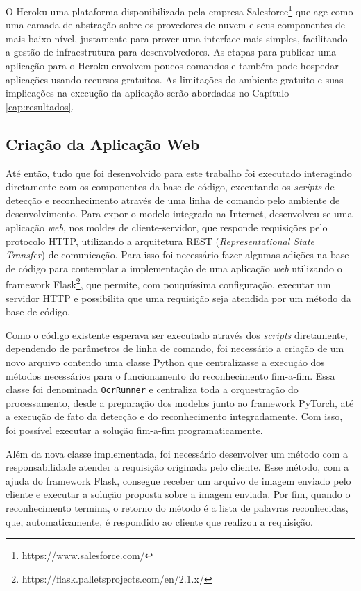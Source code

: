O Heroku uma plataforma disponibilizada pela empresa Salesforce\footnote{https://www.salesforce.com/} que age como uma camada de abstração sobre os 
provedores de nuvem e seus componentes de mais baixo nível, justamente para prover uma interface mais simples, facilitando a gestão de infraestrutura 
para desenvolvedores. As etapas para publicar uma aplicação para o Heroku envolvem poucos comandos e também pode hospedar aplicações usando recursos 
gratuitos. As limitações do ambiente gratuito e suas implicações na execução da aplicação serão abordadas no Capítulo \ref{cap:resultados}.

\subsection{Criação da Aplicação Web}\label{sec:methodology_web_app}
Até então, tudo que foi desenvolvido para este trabalho foi executado interagindo diretamente com os componentes da base de código, executando os 
\textit{scripts} de detecção e reconhecimento através de uma linha de comando pelo ambiente de desenvolvimento. Para expor o modelo integrado na Internet, 
desenvolveu-se uma aplicação \textit{web}, nos moldes de cliente-servidor, que responde requisições pelo protocolo HTTP, utilizando a arquitetura REST 
(\textit{Representational State Transfer}) de comunicação. Para isso foi necessário fazer algumas adições na base de código para contemplar a 
implementação de uma aplicação \textit{web} utilizando o framework Flask\footnote{https://flask.palletsprojects.com/en/2.1.x/}, que permite, com 
pouquíssima configuração, executar um servidor HTTP e possibilita que uma requisição seja atendida por um método da base de código.

Como o código existente esperava ser executado através dos \textit{scripts} diretamente, dependendo de parâmetros de linha de comando, foi necessário a 
criação de um novo arquivo contendo uma classe Python que centralizasse a execução dos métodos necessários para o funcionamento do reconhecimento 
fim-a-fim. Essa classe foi denominada \texttt{OcrRunner} e centraliza toda a orquestração do processamento, desde a preparação dos modelos junto ao 
framework PyTorch, até a execução de fato da detecção e do reconhecimento integradamente. Com isso, foi possível executar a solução fim-a-fim programaticamente.

Além da nova classe implementada, foi necessário desenvolver um método com a responsabilidade atender a requisição originada pelo cliente. Esse método, 
com a ajuda do framework Flask, consegue receber um arquivo de imagem enviado pelo cliente e executar a solução proposta sobre a imagem enviada. 
Por fim, quando o reconhecimento termina, o retorno do método é a lista de palavras reconhecidas, que, automaticamente, é respondido ao cliente que 
realizou a requisição.

